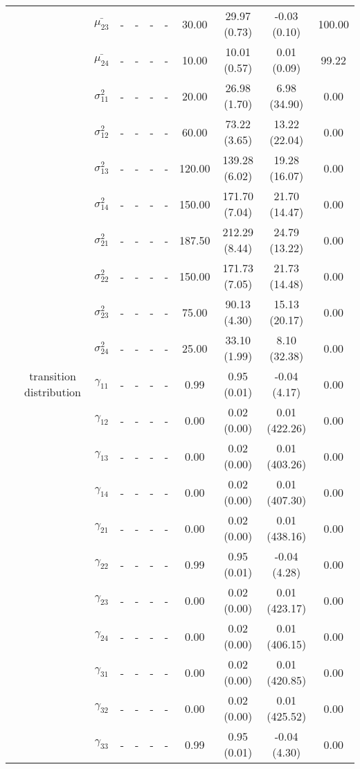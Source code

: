 \begin{table}[h]
{\begin{tabular}{ccccccccccc}
 &  & $\bar{\mu_{23}}$ & - & - & - & - & 30.00 & 29.97 (0.73) & -0.03 (0.10) & 100.00 \\
 &  & $\bar{\mu_{24}}$ & - & - & - & - & 10.00 & 10.01 (0.57) & 0.01 (0.09) & 99.22 \\
 &  & $\sigma^2_{11}$ & - & - & - & - & 20.00 & 26.98 (1.70) & 6.98 (34.90) & 0.00 \\
 &  & $\sigma^2_{12}$ & - & - & - & - & 60.00 & 73.22 (3.65) & 13.22 (22.04) & 0.00 \\
 &  & $\sigma^2_{13}$ & - & - & - & - & 120.00 & 139.28 (6.02) & 19.28 (16.07) & 0.00 \\
 &  & $\sigma^2_{14}$ & - & - & - & - & 150.00 & 171.70 (7.04) & 21.70 (14.47) & 0.00 \\
 &  & $\sigma^2_{21}$ & - & - & - & - & 187.50 & 212.29 (8.44) & 24.79 (13.22) & 0.00 \\
 &  & $\sigma^2_{22}$ & - & - & - & - & 150.00 & 171.73 (7.05) & 21.73 (14.48) & 0.00 \\
 &  & $\sigma^2_{23}$ & - & - & - & - & 75.00 & 90.13 (4.30) & 15.13 (20.17) & 0.00 \\
 &  & $\sigma^2_{24}$ & - & - & - & - & 25.00 & 33.10 (1.99) & 8.10 (32.38) & 0.00 \\
 & transition distribution & $\gamma_{11}$ & - & - & - & - & 0.99 & 0.95 (0.01) & -0.04 (4.17) & 0.00 \\
 & \multirow{15}{*}{} & $\gamma_{12}$ & - & - & - & - & 0.00 & 0.02 (0.00) & 0.01 (422.26) & 0.00 \\
 &  & $\gamma_{13}$ & - & - & - & - & 0.00 & 0.02 (0.00) & 0.01 (403.26) & 0.00 \\
 &  & $\gamma_{14}$ & - & - & - & - & 0.00 & 0.02 (0.00) & 0.01 (407.30) & 0.00 \\
 &  & $\gamma_{21}$ & - & - & - & - & 0.00 & 0.02 (0.00) & 0.01 (438.16) & 0.00 \\
 &  & $\gamma_{22}$ & - & - & - & - & 0.99 & 0.95 (0.01) & -0.04 (4.28) & 0.00 \\
 &  & $\gamma_{23}$ & - & - & - & - & 0.00 & 0.02 (0.00) & 0.01 (423.17) & 0.00 \\
 &  & $\gamma_{24}$ & - & - & - & - & 0.00 & 0.02 (0.00) & 0.01 (406.15) & 0.00 \\
 &  & $\gamma_{31}$ & - & - & - & - & 0.00 & 0.02 (0.00) & 0.01 (420.85) & 0.00 \\
 &  & $\gamma_{32}$ & - & - & - & - & 0.00 & 0.02 (0.00) & 0.01 (425.52) & 0.00 \\
 &  & $\gamma_{33}$ & - & - & - & - & 0.99 & 0.95 (0.01) & -0.04 (4.30) & 0.00 \\

\end{tabular}}
\end{table}
